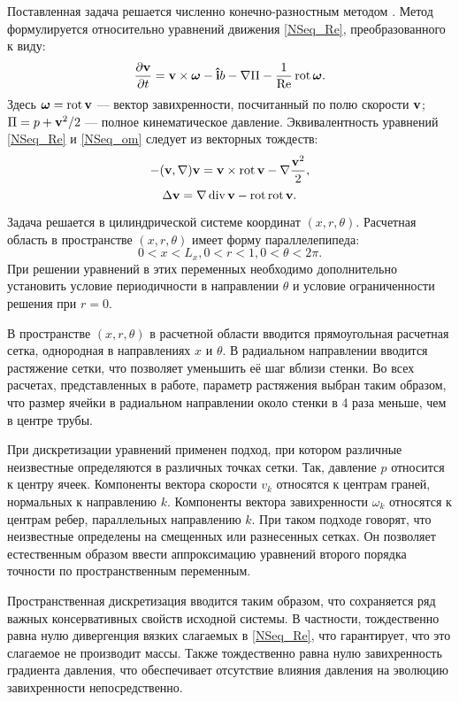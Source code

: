 Поставленная задача решается численно конечно-разностным методом \cite{Nikitin2006}. Метод формулируется относительно уравнений движения \eqref{NSeq_Re}, преобразованного к виду:
\begin{equation}\label{NSeq_om}
\frac{\partial \mathbf{v}}{\partial t} =  \mathbf{v} \times \mbox{\boldmath$\omega$}  - \mathbf{\hat{i}} b - \nabla \Pi - \frac{1}{\operatorname{Re}} \mathop{}\!\operatorname{rot} \mbox{\boldmath$\omega$}.
\end{equation}
Здесь $\mbox{\boldmath$\omega$} = \mathop{}\!\operatorname{rot} \mathbf{v}$ --- вектор завихренности, посчитанный по полю скорости $\mathbf{v}$; $\Pi = p + \mathbf{v}^2/2$ --- полное кинематическое давление. Эквивалентность уравнений \eqref{NSeq_Re} и \eqref{NSeq_om} следует из векторных тождеств:
\begin{equation*}
-(\mathbf{v}, \nabla) \mathbf{v} = \mathbf{v} \times \mathop{}\!\operatorname{rot} \mathbf{v} - \nabla \frac{\mathbf{v}^2}{2},
\end{equation*}
\begin{equation*}
\mathop{}\!\Delta \mathbf{v} = \nabla \mathop{}\!\operatorname{div} \mathbf{v} - \mathop{}\!\operatorname{rot} \mathop{}\!\operatorname{rot} \mathbf{v}.
\end{equation*}

Задача решается в цилиндрической системе координат $(x,r,\theta)$. Расчетная область в пространстве $(x,r,\theta)$ имеет форму параллелепипеда:
\begin{equation}
0 < x < L_x, 0 < r < 1, 0 < \theta < 2\pi.
\end{equation}
При решении уравнений в этих переменных необходимо дополнительно установить условие периодичности в направлении $\theta$ и условие ограниченности решения при $r=0$.

В пространстве $(x,r,\theta)$ в расчетной области вводится прямоугольная расчетная сетка, однородная в направлениях $x$ и $\theta$. В радиальном направлении вводится растяжение сетки, что позволяет уменьшить её шаг вблизи стенки. Во всех расчетах, представленных в работе, параметр растяжения выбран таким образом, что размер ячейки в радиальном направлении около стенки в 4 раза меньше, чем в центре трубы. 

При дискретизации уравнений применен подход, при котором различные неизвестные определяются в различных точках сетки. Так, давление $p$ относится к центру ячеек. Компоненты вектора скорости $v_k$ относятся к центрам граней, нормальных к направлению $k$. Компоненты вектора завихренности $\omega_k$ относятся к центрам ребер, параллельных направлению $k$. При таком подходе говорят, что неизвестные определены на смещенных или разнесенных сетках. Он позволяет естественным образом ввести аппроксимацию уравнений второго порядка точности по пространственным переменным.

Пространственная дискретизация вводится таким образом, что сохраняется ряд важных консервативных свойств исходной системы. В частности, тождественно равна нулю дивергенция вязких слагаемых в \eqref{NSeq_Re}, что гарантирует, что это слагаемое не производит массы. Также тождественно равна нулю завихренность градиента давления, что обеспечивает отсутствие влияния давления на эволюцию завихренности непосредственно. 

